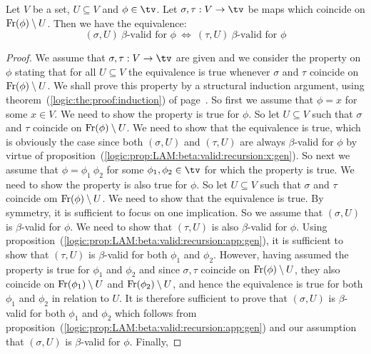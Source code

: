 \begin{prop}\label{logic:prop:LAM:free:support:beta:valid}
    Let $V$ be a set, $U\subseteq V$ and $\phi\in\tv$. Let $\sigma,\tau:V\to\tv$ be maps
    which coincide on $\mbox{\rm Fr}(\phi)\setminus U$. Then we have the equivalence:
        \[
            (\sigma,U)\ \mbox{$\beta$-valid for $\phi$}\ 
            \Leftrightarrow\
            (\tau,U)\ \mbox{$\beta$-valid for $\phi$}
        \]
\end{prop}
\begin{proof}
    We assume that $\sigma,\tau:V\to\tv$ are given and we consider the property 
    on $\phi$ stating that for all $U\subseteq V$ the equivalence is true whenever
    $\sigma$ and $\tau$ coincide on $\mbox{\rm Fr}(\phi)\setminus U$. We shall prove
    this property by a structural induction argument, using 
    theorem~(\ref{logic:the:proof:induction})
    of page~\pageref{logic:the:proof:induction}. So first we assume that $\phi=x$
    for some $x\in V$. We need to show the property is true for $\phi$. So
    let $U\subseteq V$ such that $\sigma$ and $\tau$ coincide on 
    $\mbox{\rm Fr}(\phi)\setminus U$. We need to show that the equivalence is true,
    which is obviously the case since both $(\sigma,U)$ and $(\tau,U)$ are
    always $\beta$-valid for $\phi$ by virtue of 
    proposition~(\ref{logic:prop:LAM:beta:valid:recursion:x:gen}). So next
    we assume that $\phi=\phi_{1}\ \phi_{2}$ for some $\phi_{1},\phi_{2}\in\tv$
    for which the property is true. We need to show the property is also true
    for $\phi$. So let $U\subseteq V$ such that $\sigma$ and $\tau$ coincide
    om $\mbox{\rm Fr}(\phi)\setminus U$. We need to show that the equivalence is true.
    By symmetry, it is sufficient to focus on one implication. So we assume
    that $(\sigma,U)$ is $\beta$-valid for $\phi$. We need to show that 
    $(\tau,U)$ is also $\beta$-valid for $\phi$. Using
    proposition~(\ref{logic:prop:LAM:beta:valid:recursion:app:gen}), it is
    sufficient to show that $(\tau,U)$ is $\beta$-valid for both $\phi_{1}$
    and $\phi_{2}$. However, having assumed the property is true for $\phi_{1}$
    and $\phi_{2}$ and since $\sigma,\tau$ coincide on $\mbox{\rm Fr}(\phi)\setminus U$,
    they also coincide on $\mbox{\rm Fr}(\phi_{1})\setminus U$ and $\mbox{\rm Fr}(\phi_{2})
    \setminus U$, and hence the equivalence is true for both $\phi_{1}$ and 
    $\phi_{2}$ in relation to $U$. It is therefore sufficient to prove that
    $(\sigma,U)$ is $\beta$-valid for both $\phi_{1}$ and $\phi_{2}$ which 
    follows from proposition~(\ref{logic:prop:LAM:beta:valid:recursion:app:gen})
    and our assumption that $(\sigma,U)$ is $\beta$-valid for $\phi$. Finally,

\end{proof}
